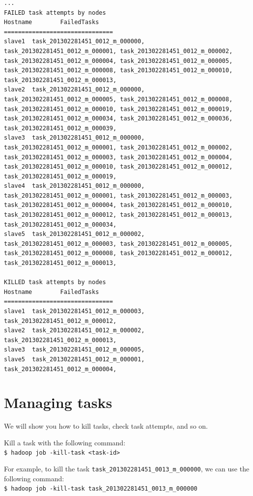 \begin{verbatim}
...
FAILED task attempts by nodes
Hostname        FailedTasks
===============================
slave1  task_201302281451_0012_m_000000, task_201302281451_0012_m_000001, task_201302281451_0012_m_000002, task_201302281451_0012_m_000004, task_201302281451_0012_m_000005, task_201302281451_0012_m_000008, task_201302281451_0012_m_000010, task_201302281451_0012_m_000013,
slave2  task_201302281451_0012_m_000000, task_201302281451_0012_m_000005, task_201302281451_0012_m_000008, task_201302281451_0012_m_000010, task_201302281451_0012_m_000019, task_201302281451_0012_m_000034, task_201302281451_0012_m_000036, task_201302281451_0012_m_000039,
slave3  task_201302281451_0012_m_000000, task_201302281451_0012_m_000001, task_201302281451_0012_m_000002, task_201302281451_0012_m_000003, task_201302281451_0012_m_000004, task_201302281451_0012_m_000010, task_201302281451_0012_m_000012, task_201302281451_0012_m_000019,
slave4  task_201302281451_0012_m_000000, task_201302281451_0012_m_000001, task_201302281451_0012_m_000003, task_201302281451_0012_m_000004, task_201302281451_0012_m_000010, task_201302281451_0012_m_000012, task_201302281451_0012_m_000013, task_201302281451_0012_m_000034,
slave5  task_201302281451_0012_m_000002, task_201302281451_0012_m_000003, task_201302281451_0012_m_000005, task_201302281451_0012_m_000008, task_201302281451_0012_m_000012, task_201302281451_0012_m_000013,

KILLED task attempts by nodes
Hostname        FailedTasks
===============================
slave1  task_201302281451_0012_m_000003, task_201302281451_0012_m_000012,
slave2  task_201302281451_0012_m_000002, task_201302281451_0012_m_000013,
slave3  task_201302281451_0012_m_000005,
slave5  task_201302281451_0012_m_000001, task_201302281451_0012_m_000004,
\end{verbatim}

\section{Managing tasks}
We will show you how to kill tasks, check task attempts, and so on. 

Kill a task with the following command: \\
\verb|$ hadoop job -kill-task <task-id> |

For example, to kill the task \verb|task_201302281451_0013_m_000000|, we can use the following command: \\ 
\verb|$ hadoop job -kill-task task_201302281451_0013_m_000000|

